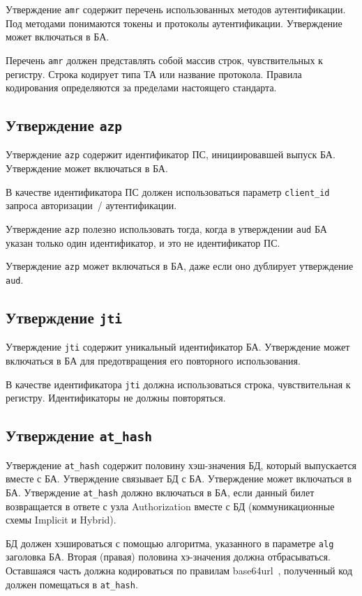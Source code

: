 Утверждение \lstinline{amr} содержит перечень использованных методов
аутентификации. Под методами понимаются токены и протоколы аутентификации.
%
Утверждение может включаться в БА.

Перечень \lstinline{amr} должен представлять собой массив строк,
чувствительных к регистру. Строка кодирует типа ТА или название протокола.
%
Правила кодирования определяются за пределами настоящего стандарта.

\subsection{Утверждение \lstinline{azp}}\label{CLAIMS.Azp}

Утверждение \lstinline{azp} содержит идентификатор ПС, инициировавшей выпуск 
БА. Утверждение может включаться в БА.

В качестве идентификатора ПС должен использоваться параметр 
\lstinline{client_id} запроса авторизации~/ аутентификации.

Утверждение \lstinline{azp} полезно использовать тогда, когда 
в утверждении \lstinline{aud} БА указан только один идентификатор,
и это не идентификатор ПС.

Утверждение \lstinline{azp} может включаться в БА, даже если оно дублирует 
утверждение \lstinline{aud}.


\subsection{Утверждение \lstinline{jti}}\label{CLAIMS.Jti}

Утверждение \lstinline{jti} содержит уникальный идентификатор БА.
Утверждение может включаться в БА для предотвращения его повторного использования.

В качестве идентификатора \lstinline{jti} должна использоваться строка, 
чувствительная к регистру. Идентификаторы не должны повторяться.

\subsection{Утверждение \lstinline{at_hash}}\label{CLAIMS.AtHash}

Утверждение \lstinline{at_hash} содержит половину хэш-значения БД, который 
выпускается вместе с БА. Утверждение связывает БД с БА. Утверждение может 
включаться в БА.
%
Утверждение \lstinline{at_hash} должно включаться в БА, если данный билет 
возвращается в ответе с узла Authorization вместе с БД (коммуникационные 
схемы Implicit и Hybrid).

БД должен хэшироваться с помощью алгоритма, указанного в параметре
\lstinline{alg} заголовка БА. Вторая (правая) половина хэ-значения 
должна отбрасываться. Оставшаяся часть должна кодироваться по правилам 
base64url~\cite{RFC4648}, полученный код должен помещаться в 
\lstinline{at_hash}.
   





